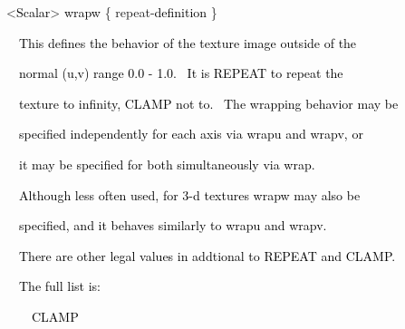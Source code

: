 \documentclass[a4paper]{article}
\newcommand\textstyleOOoComputerKeyWord[1]{\textrm{\textcolor[rgb]{0.0,0.0,0.5019608}{#1}}}
\newcommand\textstyleOOoAssemblerSpecialChar[1]{\textrm{\textcolor[rgb]{0.0,0.5019608,0.0}{#1}}}
\newcommand\textstyleOOoAssemblerIdent[1]{\textrm{\textcolor{black}{#1}}}
\newcommand\textstyleOOoAssemblerDirective[1]{\textrm{\textcolor[rgb]{0.0,0.5019608,1.0}{#1}}}
\begin{document}
{\color{black}
\textstyleOOoComputerKeyWord{\textcolor{black}{\ \ }}\textstyleOOoAssemblerSpecialChar{{\textless}}\textstyleOOoAssemblerIdent{Scalar}\textstyleOOoAssemblerSpecialChar{{\textgreater}}\textstyleOOoComputerKeyWord{\textcolor{black}{
}}\textstyleOOoAssemblerIdent{wrapw}\textstyleOOoComputerKeyWord{\textcolor{black}{
}}\textstyleOOoAssemblerSpecialChar{\{}\textstyleOOoComputerKeyWord{\textcolor{black}{
}}\textstyleOOoAssemblerDirective{repeat}\textstyleOOoAssemblerSpecialChar{{}-}\textstyleOOoAssemblerIdent{definition}\textstyleOOoComputerKeyWord{\textcolor{black}{
}}\textstyleOOoAssemblerSpecialChar{\}}}


\bigskip

{\color{black}
\textstyleOOoComputerKeyWord{\textcolor{black}{\ \ \ \ This defines the behavior of the texture image outside of the}}}

{\color{black}
\textstyleOOoComputerKeyWord{\textcolor{black}{\ \ \ \ normal (u,v) range 0.0 - 1.0. \ It is
{\textquotedbl}REPEAT{\textquotedbl} to repeat the}}}

{\color{black}
\textstyleOOoComputerKeyWord{\textcolor{black}{\ \ \ \ texture to infinity, {\textquotedbl}CLAMP{\textquotedbl} not to.
\ The wrapping behavior may be}}}

{\color{black}
\textstyleOOoComputerKeyWord{\textcolor{black}{\ \ \ \ specified independently for each axis via
{\textquotedbl}wrapu{\textquotedbl} and {\textquotedbl}wrapv{\textquotedbl}, or}}}

{\color{black}
\textstyleOOoComputerKeyWord{\textcolor{black}{\ \ \ \ it may be specified for both simultaneously via
{\textquotedbl}wrap{\textquotedbl}.}}}


\bigskip

{\color{black}
\textstyleOOoComputerKeyWord{\textcolor{black}{\ \ \ \ Although less often used, for 3-d textures wrapw may also be}}}

{\color{black}
\textstyleOOoComputerKeyWord{\textcolor{black}{\ \ \ \ specified, and it behaves similarly to wrapu and wrapv.}}}


\bigskip

{\color{black}
\textstyleOOoComputerKeyWord{\textcolor{black}{\ \ \ \ There are other legal values in addtional to REPEAT and CLAMP.}}}

{\color{black}
\textstyleOOoComputerKeyWord{\textcolor{black}{\ \ \ \ The full list is:}}}


\bigskip

{\color{black}
\textstyleOOoComputerKeyWord{\textcolor{black}{\ \ \ \ \ \ CLAMP}}}
\end{document}
